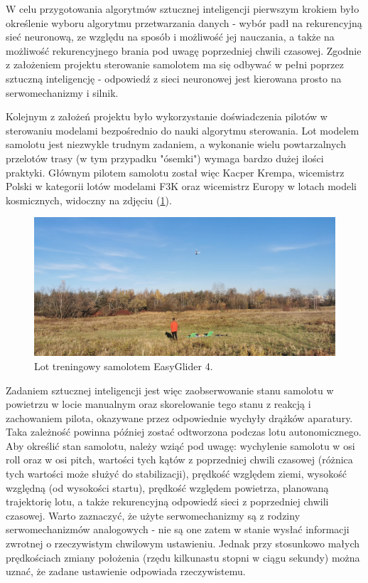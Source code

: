 \documentclass[12pt, a4paper]{article}
\let\oldref\ref
\renewcommand{\ref}[1]{(\oldref{#1})}
\begin{document}
W celu przygotowania algorytmów sztucznej inteligencji pierwszym krokiem było określenie wyboru algorytmu przetwarzania danych - wybór padł na rekurencyjną sieć neuronową, ze względu na sposób i możliwość jej nauczania, a także na możliwość rekurencyjnego brania pod uwagę poprzedniej chwili czasowej. Zgodnie z założeniem projektu sterowanie samolotem ma się odbywać w pełni poprzez sztuczną inteligencję - odpowiedź z sieci neuronowej jest kierowana prosto na serwomechanizmy i silnik. 

Kolejnym z założeń projektu było wykorzystanie doświadczenia pilotów w sterowaniu modelami  bezpośrednio do nauki algorytmu sterowania. Lot modelem samolotu jest niezwykle trudnym zadaniem, a wykonanie wielu powtarzalnych przelotów trasy (w tym przypadku "ósemki") wymaga bardzo dużej ilości praktyki. Głównym pilotem samolotu został więc Kacper Krempa, wicemistrz Polski w kategorii lotów modelami F3K oraz wicemistrz Europy w lotach modeli kosmicznych, widoczny na zdjęciu \ref{fig:kacper}.

 \begin{figure}[ht]
    \centering
    \includegraphics[width=1\textwidth]{kacperlata}
    \caption{Lot treningowy samolotem EasyGlider 4.}
    \label{fig:kacper}
\end{figure}


Zadaniem sztucznej inteligencji jest więc zaobserwowanie stanu samolotu w powietrzu w locie manualnym oraz skorelowanie tego stanu z reakcją i zachowaniem pilota, okazywane przez odpowiednie wychyły drążków aparatury. Taka zależność powinna później zostać odtworzona podczas lotu autonomicznego. Aby określić stan samolotu, należy wziąć pod uwagę: wychylenie samolotu w osi roll oraz w osi pitch, wartości tych kątów z poprzedniej chwili czasowej (różnica tych wartości może służyć do stabilizacji), prędkość względem ziemi, wysokość względną (od wysokości startu), prędkość względem powietrza, planowaną trajektorię lotu, a także rekurencyjną odpowiedź sieci z poprzedniej chwili czasowej. Warto zaznaczyć, że użyte serwomechanizmy są z rodziny serwomechanizmów analogowych - nie są one zatem w stanie wysłać informacji zwrotnej o rzeczywistym chwilowym ustawieniu. Jednak przy stosunkowo małych prędkościach zmiany położenia (rzędu kilkunastu stopni w ciągu sekundy) można uznać, że zadane ustawienie odpowiada rzeczywistemu.
\end{document}
